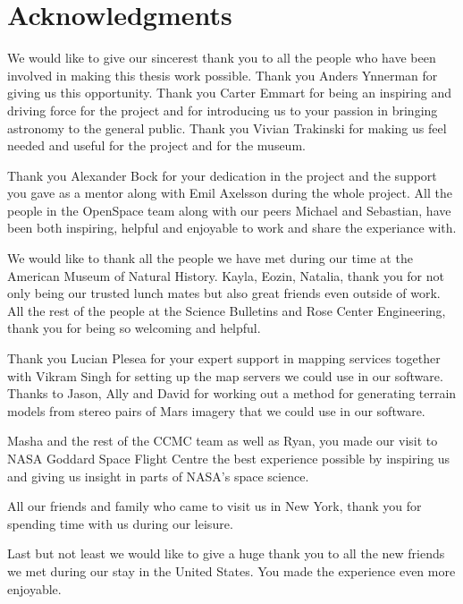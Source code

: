 \cleardoublepage
{}
{}
\chapter*{Acknowledgments}

We would like to give our sincerest thank you to all the people who have been involved in making this thesis work possible. Thank you Anders Ynnerman for giving us this opportunity. Thank you Carter Emmart for being an inspiring and driving force for the project and for introducing us to your passion in bringing astronomy to the general public. Thank you Vivian Trakinski for making us feel needed and useful for the project and for the museum.

Thank you Alexander Bock for your dedication in the project and the support you gave as a mentor along with Emil Axelsson during the whole project. All the people in the OpenSpace team along with our peers Michael and Sebastian, have been both inspiring, helpful and enjoyable to work and share the experiance with.

We would like to thank all the people we have met during our time at the American Museum of Natural History. Kayla, Eozin, Natalia, thank you for not only being our trusted lunch mates but also great friends even outside of work.
All the rest of the people at the Science Bulletins and Rose Center Engineering, thank you for being so welcoming and helpful.

Thank you Lucian Plesea for your expert support in mapping services together with Vikram Singh for setting up the map servers we could use in our software. Thanks to Jason, Ally and David for working out a method for generating terrain models from stereo pairs of Mars imagery that we could use in our software.

Masha and the rest of the CCMC team as well as Ryan, you made our visit to NASA Goddard Space Flight Centre the best experience possible by inspiring us and giving us insight in parts of NASA's space science.

All our friends and family who came to visit us in New York, thank you for spending time with us during our leisure.

Last but not least we would like to give a huge thank you to all the new friends we met during our stay in the United States. You made the experience even more enjoyable.

\newpage
